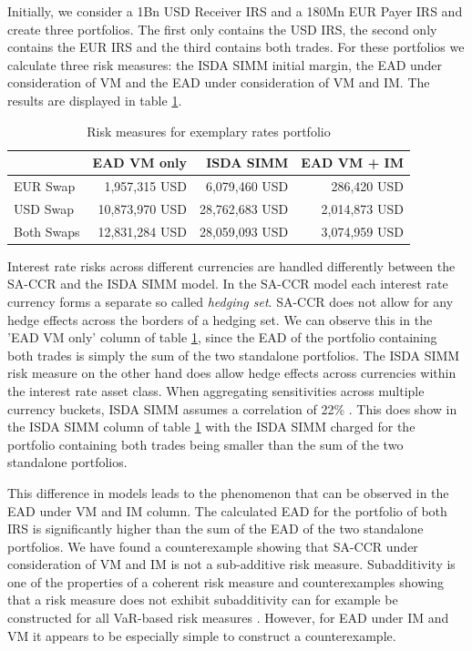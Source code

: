 \documentclass[../Thesis_AHoecherl.tex]{subfiles}
\begin{document}
    Initially, we consider a 1Bn USD Receiver \gls{IRS} and a 180Mn EUR Payer \gls{IRS} and create three portfolios. The first only contains the USD \gls{IRS}, the second only contains the EUR \gls{IRS} and the third contains both trades.
    For these portfolios we calculate three risk measures: the \gls{ISDA SIMM} initial margin, the \gls{EAD} under consideration of \gls{VM} and the \gls{EAD} under consideration of \gls{VM} and IM. The results are displayed in table \ref{tab:2TradeRatesResults}.

    \begin{table}[htbp]
        \centering
        \begin{tabular}{l||r|r|r}
                & \gls{EAD} \gls{VM} only &\gls{ISDA SIMM} & \gls{EAD} \gls{VM} + \gls{IM} \\
                \toprule
        EUR Swap & 1,957,315 USD & 6,079,460 USD & 286,420 USD \\
        USD Swap & 10,873,970 USD & 28,762,683 USD & 2,014,873 USD \\
        Both Swaps & 12,831,284 USD & 28,059,093 USD & 3,074,959 USD \\
        \end{tabular}%
        \caption{Risk measures for exemplary rates portfolio}
        \label{tab:2TradeRatesResults}%
    \end{table}%

    Interest rate risks across different currencies are handled differently between the \gls{SA-CCR} and the \gls{ISDA SIMM} model.
    In the \gls{SA-CCR} model each interest rate currency forms a separate so called \emph{hedging set}. \gls{SA-CCR} does not allow for any hedge effects across the borders of a hedging set.
    We can observe this in the 'EAD \gls{VM} only' column of table \ref{tab:2TradeRatesResults}, since the \gls{EAD} of the portfolio containing both trades is simply the sum of the two standalone portfolios.
    The \gls{ISDA SIMM} risk measure on the other hand does allow hedge effects across currencies within the interest rate asset class. When aggregating sensitivities across multiple currency buckets, \gls{ISDA SIMM} assumes a correlation of 22\% \cite[Section D.2]{SIMM}.
    This does show in the \gls{ISDA SIMM} column of table \ref{tab:2TradeRatesResults} with the \gls{ISDA SIMM} charged for the portfolio containing both trades being smaller than the sum of the two standalone portfolios.
    
    This difference in models leads to the phenomenon that can be observed in the \gls{EAD} under \gls{VM} and \gls{IM} column. The calculated \gls{EAD} for the portfolio of both \gls{IRS} is significantly higher than the sum of the \gls{EAD} of the two standalone portfolios.
    We have found a counterexample showing that \gls{SA-CCR} under consideration of \gls{VM} and \gls{IM} is not a sub-additive risk measure.
    Subadditivity is one of the properties of a coherent risk measure  and counterexamples showing that a risk measure does not exhibit subadditivity can for example be constructed for all \gls{VaR}-based risk measures . However, for \gls{EAD} under \gls{IM} and \gls{VM} it appears to be especially simple to construct a counterexample.
\end{document}
